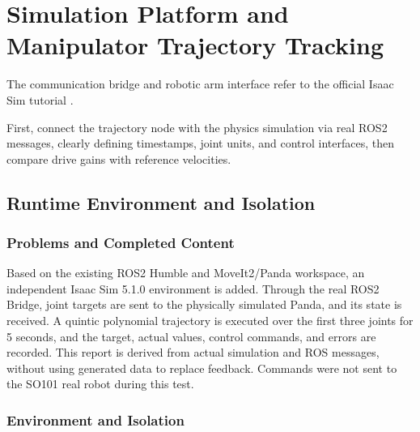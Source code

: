 \chapter{Simulation Platform and Manipulator Trajectory Tracking}
The communication bridge and robotic arm interface refer to the official Isaac Sim tutorial \cite{isaac}.


First, connect the trajectory node with the physics simulation via real ROS2 messages, clearly defining timestamps, joint units, and control interfaces, then compare drive gains with reference velocities.

\section{Runtime Environment and Isolation}

\label{stage:s01}

\subsection{Problems and Completed Content}\label{s01-detail-1}

Based on the existing ROS2 Humble and MoveIt2/Panda workspace, an independent Isaac Sim 5.1.0 environment is added. Through the real ROS2 Bridge, joint targets are sent to the physically simulated Panda, and its state is received. A quintic polynomial trajectory is executed over the first three joints for 5 seconds, and the target, actual values, control commands, and errors are recorded. This report is derived from actual simulation and ROS messages, without using generated data to replace feedback. Commands were not sent to the SO101 real robot during this test.

\subsection{Environment and Isolation}\label{s01-detail-2}

